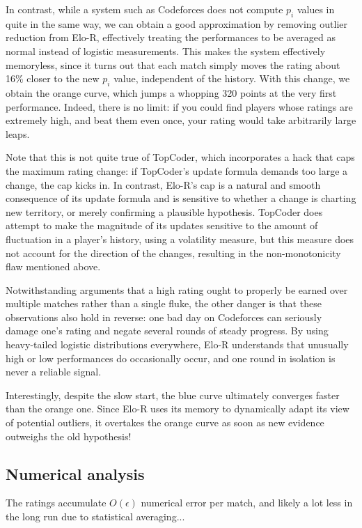 \documentclass{article}
\begin{document}
In contrast, while a system such as Codeforces does not compute $p_i$ values in quite in the same way, we can obtain a good approximation by removing outlier reduction from Elo-R, effectively treating the performances to be averaged as normal instead of logistic measurements. This makes the system effectively memoryless, since it turns out that each match simply moves the rating about 16\% closer to the new $p_i$ value, independent of the history. With this change, we obtain the orange curve, which jumps a whopping 320 points at the very first performance. Indeed, there is no limit: if you could find players whose ratings are extremely high, and beat them even once, your rating would take arbitrarily large leaps.

Note that this is not quite true of TopCoder, which incorporates a hack that caps the maximum rating change: if TopCoder's update formula demands too large a change, the cap kicks in. In contrast, Elo-R's cap is a natural and smooth consequence of its update formula and is sensitive to whether a change is charting new territory, or merely confirming a plausible hypothesis. TopCoder does attempt to make the magnitude of its updates sensitive to the amount of fluctuation in a player's history, using a volatility measure, but this measure does not account for the direction of the changes, resulting in the non-monotonicity flaw mentioned above.

Notwithstanding arguments that a high rating ought to properly be earned over multiple matches rather than a single fluke, the other danger is that these observations also hold in reverse: one bad day on Codeforces can seriously damage one's rating and negate several rounds of steady progress. By using heavy-tailed logistic distributions everywhere, Elo-R understands that unusually high or low performances do occasionally occur, and one round in isolation is never a reliable signal.

Interestingly, despite the slow start, the blue curve ultimately converges faster than the orange one. Since Elo-R uses its memory to dynamically adapt its view of potential outliers, it overtakes the orange curve as soon as new evidence outweighs the old hypothesis!

\subsection{Numerical analysis}

The ratings accumulate $O(\epsilon)$ numerical error per match, and likely a lot less in the long run due to statistical averaging...
\end{document}
